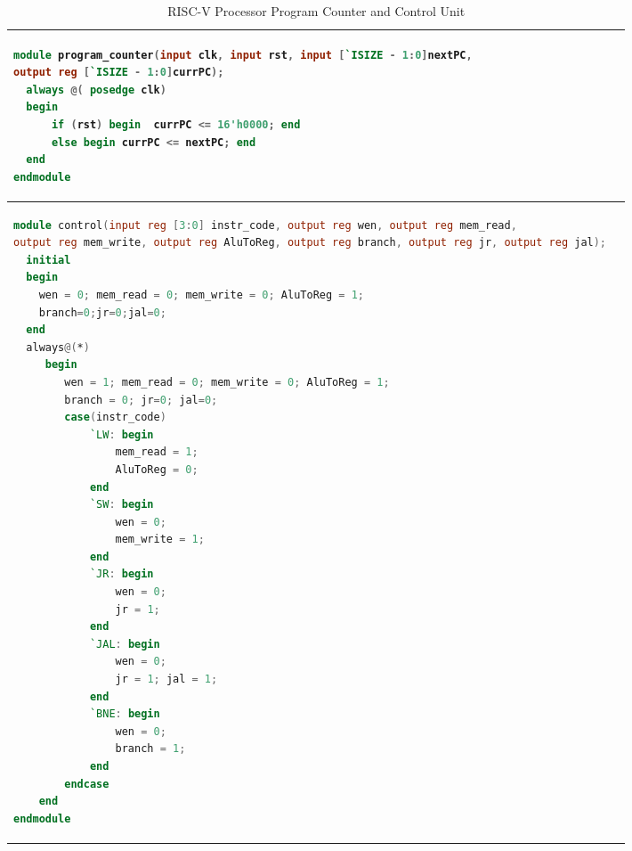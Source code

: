 \begin{table}[!h]
\centering
\caption{RISC-V Processor Program Counter and Control Unit}
\label{riscvcode2:pc_cu}
\begin{tabular}{l}
\toprule
\begin{lstlisting}[columns=fullflexible, language=Verilog]
module program_counter(input clk, input rst, input [`ISIZE - 1:0]nextPC, 
output reg [`ISIZE - 1:0]currPC);
  always @( posedge clk)
  begin
      if (rst) begin  currPC <= 16'h0000; end
      else begin currPC <= nextPC; end
  end
endmodule
\end{lstlisting}
\\
\midrule

\begin{lstlisting}[columns=fullflexible, language=Verilog]
module control(input reg [3:0] instr_code, output reg wen, output reg mem_read, 
output reg mem_write, output reg AluToReg, output reg branch, output reg jr, output reg jal);  
  initial
  begin
	wen = 0; mem_read = 0; mem_write = 0; AluToReg = 1;
	branch=0;jr=0;jal=0;
  end  
  always@(*)
 	 begin
		wen = 1; mem_read = 0; mem_write = 0; AluToReg = 1;
		branch = 0;	jr=0; jal=0;
		case(instr_code)
			`LW: begin
				mem_read = 1;
				AluToReg = 0;
			end
			`SW: begin
				wen = 0;
				mem_write = 1;
			end
			`JR: begin
				wen = 0;
				jr = 1;
			end
			`JAL: begin
				wen = 0;
				jr = 1;	jal = 1;
			end
			`BNE: begin
				wen = 0;
				branch = 1;
			end
		endcase
	end
endmodule
\end{lstlisting}
\\
\bottomrule
\end{tabular}
\end{table}

